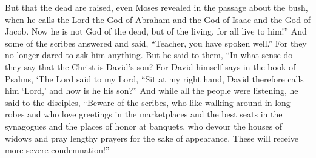 \begin{biblechapter}
\verse But that the dead are raised, even Moses revealed in the passage about the bush, when he calls the Lord the God of Abraham and the God of Isaac and the God of Jacob.
\verse Now he is not God of the dead, but of the living, for all live to him!”
\verse And some of the scribes answered and said, “Teacher, you have spoken well.”
\verse For they no longer dared to ask him anything.
 But he said to them, “In what sense do they say that the Christ is David’s son?
\verse For David himself says in the book of Psalms,
\verse ‘The Lord said to my Lord, 
“Sit at my right hand,
\verse David therefore calls him ‘Lord,’ and how is he his son?”
 And while all the people were listening, he said to the disciples,
\verse “Beware of the scribes, who like walking around in long robes and who love greetings in the marketplaces and the best seats in the synagogues and the places of honor at banquets,
\verse who devour the houses of widows and pray lengthy prayers for the sake of appearance. These will receive more severe condemnation!”
\end{biblechapter}

